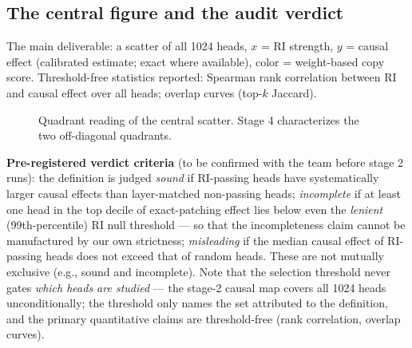 \documentclass[11pt,a4paper]{article}
\begin{document}
\subsection{The central figure and the audit verdict}
The main deliverable: a scatter of all 1024 heads, $x$ = RI strength, $y$ = causal effect (calibrated estimate; exact where available), color = weight-based copy score. Threshold-free statistics reported: Spearman rank correlation between RI and causal effect over all heads; overlap curves (top-$k$ Jaccard).

\begin{figure}[ht]
\centering
{}
\caption{Quadrant reading of the central scatter. Stage 4 characterizes the two off-diagonal quadrants.}
\end{figure}

\textbf{Pre-registered verdict criteria} (to be confirmed with the team before stage 2 runs):
the definition is judged \emph{sound} if RI-passing heads have systematically larger causal effects than layer-matched non-passing heads;
\emph{incomplete} if at least one head in the top decile of exact-patching effect lies below even the \emph{lenient} (99th-percentile) RI null threshold --- so that the incompleteness claim cannot be manufactured by our own strictness;
\emph{misleading} if the median causal effect of RI-passing heads does not exceed that of random heads.
These are not mutually exclusive (e.g., sound and incomplete). Note that the selection threshold never gates \emph{which heads are studied} --- the stage-2 causal map covers all 1024 heads unconditionally; the threshold only names the set attributed to the definition, and the primary quantitative claims are threshold-free (rank correlation, overlap curves).
\end{document}
